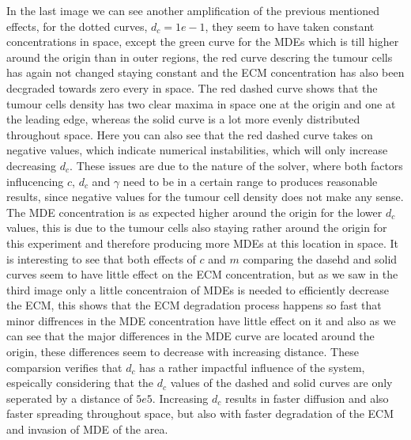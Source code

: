 In the last image we can see another amplification of the previous mentioned effects, for the dotted curves, $d_c=1e-1$, they seem to have taken constant concentrations in space, except the green curve for the MDEs which is till higher around the origin than in outer regions, the red curve descring the tumour cells has again not changed staying constant and the ECM concentration has also been decgraded towards zero every in space. The red dashed curve shows that the tumour cells density has two clear maxima in space one at the origin and one at the leading edge, whereas the solid curve is a lot more evenly distributed throughout space. Here you can also see that the red dashed curve takes on negative values, which indicate numerical instabilities, which will only increase decreasing $d_c$. These issues are due to the nature of the solver, where both factors influcencing $c$, $d_c$ and $\gamma$ need to be in a certain range to produces reasonable results, since negative values for the tumour cell density does not make any sense. The MDE concentration is as expected higher around the origin for the lower $d_c$ values, this is due to the tumour cells also staying rather around the origin for this experiment and therefore producing more MDEs at this location in space. It is interesting to see that both effects of $c$ and $m$ comparing the dasehd and solid curves seem to have little effect on the ECM concentration, but as we saw in the third image only a little concentraion of MDEs is needed to efficiently decrease the ECM, this shows that the ECM degradation process happens so fast that minor diffrences in the MDE concentration have little effect on it and also as we can see that the major differences in the MDE curve are located around the origin, these differences seem to decrease with increasing distance.
These comparsion verifies that $d_c$ has a rather impactful influence of the system, espeically considering that the $d_c$ values of the dashed and solid curves are only seperated by a distance of $5e5$. Increasing $d_c$ results in faster diffusion and also faster spreading throughout space, but also with faster degradation of the ECM and invasion of MDE of the area.

